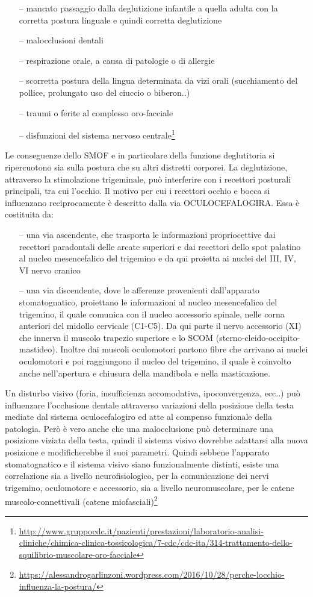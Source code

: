 \begin{itemize}
 \itemsep-0.5em 
 \item[--]mancato passaggio dalla deglutizione infantile a quella adulta con la corretta postura linguale e quindi corretta deglutizione
 \item[--]malocclusioni dentali
 \item[--]respirazione orale, a causa di patologie o di allergie
 \item[--]scorretta postura della lingua determinata da vizi orali (succhiamento del pollice, prolungato uso del ciuccio o biberon..)
 \item[--]traumi o ferite al complesso oro-facciale
 \item[--]disfunzioni del sistema nervoso centrale\footnote{\url{http://www.gruppocdc.it/pazienti/prestazioni/laboratorio-analisi-cliniche/chimica-clinica-tossicologica/7-cdc/cdc-ita/314-trattamento-dello-squilibrio-muscolare-oro-facciale}}
\end{itemize}
Le conseguenze dello SMOF e in particolare della funzione deglutitoria si ripercuotono sia sulla postura che su altri distretti corporei. La deglutizione, attraverso la stimolazione trigeminale, può interferire con i recettori posturali principali, tra cui l’occhio. Il motivo per cui i recettori occhio e bocca si influenzano reciprocamente è descritto dalla via OCULOCEFALOGIRA. Essa è costituita da:
\begin{itemize}
 \itemsep-0.5em 
 \item[--]una via ascendente, che trasporta le informazioni propriocettive dai recettori paradontali delle arcate superiori e dai recettori dello spot palatino al nucleo mesencefalico del trigemino e da qui proietta ai nuclei del III, IV, VI nervo cranico
 \item[--]una via discendente, dove le afferenze provenienti dall’apparato stomatognatico, proiettano le informazioni al nucleo mesencefalico del trigemino, il quale comunica con il nucleo accessorio spinale, nelle corna anteriori del midollo cervicale (C1-C5). Da qui parte il nervo accessorio (XI) che innerva il muscolo trapezio superiore e lo SCOM (sterno-cleido-occipito-mastideo). Inoltre dai muscoli oculomotori partono fibre che arrivano ai nuclei oculomotori e poi raggiungono il nucleo del trigemino, il quale è coinvolto anche nell’apertura e chiusura della mandibola e nella masticazione.
\end{itemize}

Un disturbo visivo (foria, insufficienza accomodativa, ipoconvergenza, ecc..) può influenzare l’occlusione dentale attraverso variazioni della posizione della testa mediate dal sistema oculocefalogiro ed atte al compenso funzionale della patologia. Però è vero anche che una malocclusione può determinare una posizione viziata della testa, quindi il sistema visivo dovrebbe adattarsi alla nuova posizione e modificherebbe il suoi parametri. Quindi sebbene l’apparato stomatognatico e il sistema visivo siano funzionalmente distinti, esiste una correlazione sia a livello neurofisiologico, per la comunicazione dei nervi trigemino, oculomotore e accessorio, sia a livello neuromuscolare, per le catene muscolo-connettivali (catene miofasciali)\footnote{\url{https://alessandrogarlinzoni.wordpress.com/2016/10/28/perche-locchio-influenza-la-postura/}}
